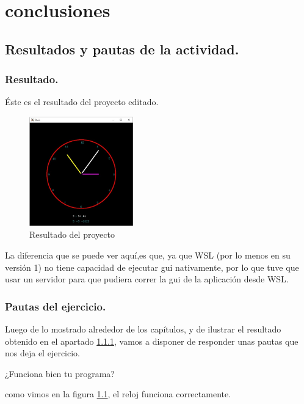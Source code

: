 \chapter{conclusiones} \label{Conclusiones}

\section{Resultados y pautas de la actividad.} \label{sec:resultado}
\subsection{Resultado.} \label{subsec:resultado}
Éste es el resultado del proyecto editado.

\begin{figure}[H]
\centering
\includegraphics[width=0.4\textwidth]{../img/chapter03/7.png}
\caption{Resultado del proyecto}
\label{fig:resultado}
\end{figure}

La diferencia que se puede ver aquí,es que, ya que WSL (por lo menos en su versión 1) no tiene capacidad de ejecutar gui nativamente, por lo que tuve que usar un servidor para que pudiera correr la gui de la aplicación desde WSL.

\subsection{Pautas del ejercicio.} \label{subsec:pautas}
Luego de lo mostrado alrededor de los capítulos, y de ilustrar el resultado obtenido en el apartado \ref{subsec:resultado}, vamos a disponer de responder unas pautas que nos deja el ejercicio.

\begin{myquote}
¿Funciona bien tu programa?
\end{myquote}

como vimos en la figura \ref{fig:resultado}, el reloj funciona correctamente.

